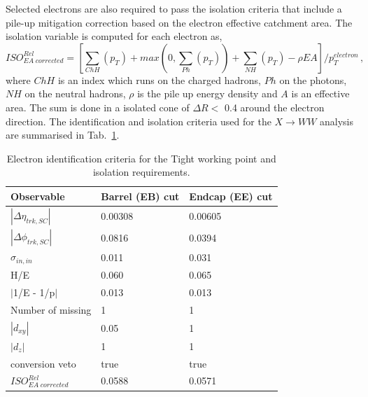 Selected electrons are also required to pass the isolation criteria that include a pile-up mitigation correction based on the electron effective 
catchment area. The isolation variable is computed for each electron as,
\begin{equation}
ISO^{Rel}_{EA\; corrected}=[\sum_{ChH}(p_T) + max(0, \sum_{Ph}(p_T)) +\sum_{NH}(p_T)  -\rho EA ]/p_T^{electron} \, ,
\end{equation}
where $ChH$ is an index which runs on the charged hadrons, $Ph$ on the photons, $NH$ on the neutral hadrons, $\rho$ is the pile up energy
density and $A$ is an effective area. The sum is done in a isolated cone of $\Delta R<$ 0.4 around the electron direction.
The identification and isolation criteria used for the $X \to WW$ analysis are summarised in Tab.~\ref{IDe}.
\begin{table}
\centering
\begin{tabular}{|lll|}
\hline
Observable & Barrel (EB) cut &Endcap (EE) cut\\
\hline
$|\Delta \eta_{trk,SC}|$  &0.00308  & 0.00605 \\
$|\Delta \phi_{trk,SC}|$ & 0.0816   &0.0394\\
$\sigma_{in,in}$ &0.011& 0.031\\
H/E & 0.060& 0.065\\
$|$1/E - 1/p$|$ & 0.013 &0.013\\
Number of missing &1&1\\
$|d_{xy}|$ &0.05&1\\
$|d_z|$ &1&1\\
conversion veto& true&true\\ 
\hline
$ISO^{Rel}_{EA\; corrected}$&0.0588 & 0.0571\\
\hline
\end{tabular}
\caption{Electron identification criteria for the Tight working point and isolation requirements.}
\label{IDe}
\end{table}

